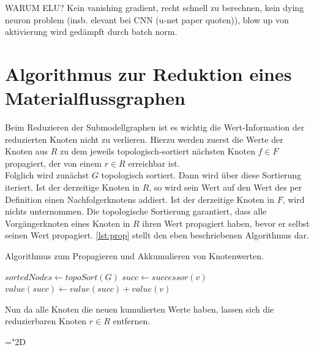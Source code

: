 WARUM ELU? 
Kein vanishing gradient, recht schnell zu berechnen, kein dying neuron problem (insb. elevant bei CNN (u-net paper quoten)), blow up von aktivierung wird gedämpft durch batch norm. 


\section{Algorithmus zur Reduktion eines Materialflussgraphen} \label{sec:reduction}

Beim Reduzieren der Submodellgraphen ist es wichtig die Wert-Information der reduzierten Knoten nicht zu verlieren. Hierzu werden zuerst die Werte der Knoten aus $R$ zu dem jeweils topologisch-sortiert nächsten Knoten $f \in F$ propagiert, der von einem $r \in R$ erreichbar ist. \\
Folglich wird zunächst $G$ topologisch sortiert. Dann wird über diese Sortierung iteriert. Ist der derzeitige Knoten in $R$, so wird sein Wert auf den Wert des per Definition einen Nachfolgerknotens addiert. Ist der derzeitige Knoten in $F$, wird nichts unternommen. Die topologische Sortierung garantiert, dass alle Vorgängerknoten eines Knoten in $R$ ihren Wert propagiert haben, bevor er selbst seinen Wert propagiert. \autoref{lst:prop} stellt den eben beschriebenen Algorithmus dar.

\begin{algorithm}
	\caption{Algorithmus zum Propagieren und Akkumulieren von Knotenwerten.}\label{lst:prop}
	\begin{algorithmic}[1]
		 
			\State $sortedNodes \gets topoSort(G)$
					\State $succ \gets successor(v)$ 
					\State $value(succ) \gets value(succ) + value(v)$
				\EndIf
			\EndFor
		\EndProcedure
	\end{algorithmic}
\end{algorithm}

Nun da alle Knoten die neuen kumulierten Werte haben, lassen sich die reduzierbaren Knoten $r \in R$ entfernen. 

\mathchardef\mhyphen="2D

